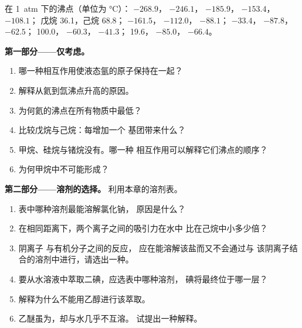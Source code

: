 \begin{problem}
\label{pb:b1:intermolecular-forces-solvents:1}
在 \qty{1}{atm} 下的沸点（单位为 \unit{\celsius}）： $-268.9$，
 $-246.1$， $-185.9$， $-153.4$， $-108.1$；
戊烷 36.1，己烷 68.8； $-161.5$， $-112.0$，
 $-88.1$； $-33.4$， $-87.8$， $-62.5$；
 100.0， $-60.3$， $-41.3$； 19.6，
 $-85.0$， $-66.4$。

\medskip
\noindent\textbf{第一部分——仅考虑。}
\begin{enumerate}
  \item 哪一种相互作用使液态氩的原子保持在一起？
  \item 解释从氦到氙沸点升高的原因。
  \item 为何氦的沸点在所有物质中最低？
  \item 比较戊烷与己烷：每增加一个  基团带来什么？
  \item 甲烷、硅烷与锗烷没有。哪一种
        相互作用可以解释它们沸点的顺序？
  \item 为何甲烷中不可能形成？
\end{enumerate}

\medskip
\noindent\textbf{第二部分——溶剂的选择。}
利用本章的溶剂表。
\begin{enumerate}[resume]
  \item 表中哪种溶剂最能溶解氯化钠，
        原因是什么？
  \item 在相同距离下，两个离子之间的吸引力在水中
        比在己烷中小多少倍？
  \item 阴离子  与有机分子之间的反应，
        应在能溶解该盐而又不会通过与
        该阴离子结合的溶剂中进行，请选出一种。
  \item 要从水溶液中萃取二碘，应选表中哪种溶剂，
        碘将最终位于哪一层？
  \item 解释为什么不能用乙醇进行该萃取。
  \item 乙醚虽为，却与水几乎不互溶。
        试提出一种解释。
\end{enumerate}


\end{problem}
